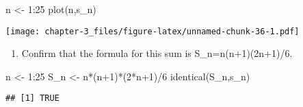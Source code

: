 \documentclass[
]{article}
\newenvironment{Shaded}{\begin{snugshade}}{\end{snugshade}}
\newcommand{\DecValTok}[1]{\textcolor[rgb]{0.00,0.00,0.81}{#1}}
\newcommand{\FunctionTok}[1]{\textcolor[rgb]{0.00,0.00,0.00}{#1}}
\newcommand{\NormalTok}[1]{#1}
\newcommand{\OtherTok}[1]{\textcolor[rgb]{0.56,0.35,0.01}{#1}}
\newcommand{\SpecialCharTok}[1]{\textcolor[rgb]{0.00,0.00,0.00}{#1}}
\providecommand{\tightlist}{%
  \setlength{\itemsep}{0pt}\setlength{\parskip}{0pt}}
\begin{document}
\begin{Shaded}
\begin{Highlighting}[]
\NormalTok{n }\OtherTok{\textless{}{-}} \DecValTok{1}\SpecialCharTok{:}\DecValTok{25}
\FunctionTok{plot}\NormalTok{(n,s\_n)}
\end{Highlighting}
\end{Shaded}

\texttt{[image: chapter-3\_files/figure-latex/unnamed-chunk-36-1.pdf]}

\begin{enumerate}
\def\labelenumi{\arabic{enumi}.}
\setcounter{enumi}{11}
\tightlist
\item
  Confirm that the formula for this sum is S\_n=n(n+1)(2n+1)/6.
\end{enumerate}

\begin{Shaded}
\begin{Highlighting}[]
\NormalTok{n }\OtherTok{\textless{}{-}} \DecValTok{1}\SpecialCharTok{:}\DecValTok{25}
\NormalTok{S\_n }\OtherTok{\textless{}{-}}\NormalTok{ n}\SpecialCharTok{*}\NormalTok{(n}\SpecialCharTok{+}\DecValTok{1}\NormalTok{)}\SpecialCharTok{*}\NormalTok{(}\DecValTok{2}\SpecialCharTok{*}\NormalTok{n}\SpecialCharTok{+}\DecValTok{1}\NormalTok{)}\SpecialCharTok{/}\DecValTok{6}
\FunctionTok{identical}\NormalTok{(S\_n,s\_n)}
\end{Highlighting}
\end{Shaded}

\begin{verbatim}
## [1] TRUE
\end{verbatim}
\end{document}
